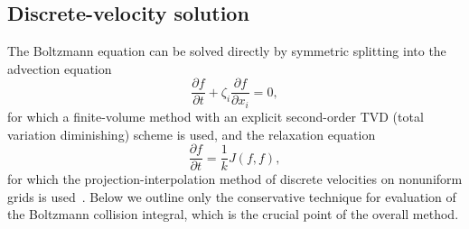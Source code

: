 \documentclass[]{jfm}
\newcommand{\pder}[2][]{\frac{\partial#1}{\partial#2}}
\begin{document}
\subsection{Discrete-velocity solution}

The Boltzmann equation can be solved directly by symmetric splitting
into the advection equation
\begin{equation}\label{eq:split_advection}
    \pder[f]{t} + \zeta_i\pder[f]{x_i} = 0,
\end{equation}
for which a finite-volume method with an explicit second-order TVD (total variation diminishing) scheme is used,
and the relaxation equation
\begin{equation}\label{eq:split_integral}
    \pder[f]{t} = \frac1k J(f,f),
\end{equation}
for which the projection-interpolation method of discrete velocities
on nonuniform grids is used~\citep{Dodulad2015}.
Below we outline only the conservative technique for evaluation
of the Boltzmann collision integral, which is the crucial point of the overall method.
\end{document}
